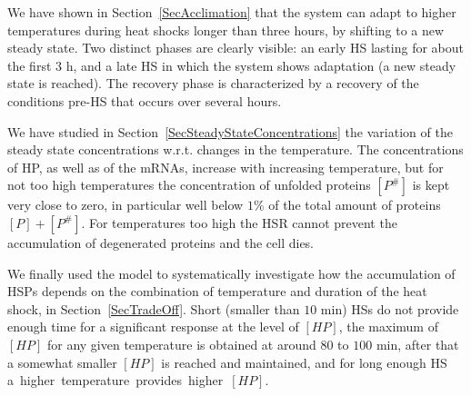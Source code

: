 \documentclass[oneside, 10pt, a4paper, twocolumn]{article}
\begin{document}
We have shown in Section~\ref{SecAcclimation} that the system can adapt to higher temperatures during heat shocks longer than three hours, by shifting to a new steady state. Two distinct phases are clearly visible: an early HS lasting for about the first $3$ h, and a late HS in which the system shows adaptation (a new steady state is reached). The recovery phase is characterized by a recovery of the conditions pre-HS that occurs over several hours. 
 
We have studied in Section~\ref{SecSteadyStateConcentrations} the variation of the steady state concentrations w.r.t. changes in the temperature. The concentrations of HP, as well as of the mRNAs, increase with increasing temperature, but for not too high temperatures the concentration of unfolded proteins $\left[P^\#\right]$ is kept very close to zero, in particular well below $1\%$ of the total amount of proteins $\left[P\right] + \left[P^\#\right]$. For temperatures too high the HSR cannot prevent the accumulation of degenerated proteins and the cell dies.

We finally used the model to systematically investigate how the accumulation of HSPs depends on the combination of temperature and duration of the heat shock, in Section~\ref{SecTradeOff}. Short (smaller than $10$ min) HSs do not provide enough time for a significant response at the level of $\left[HP\right]$, the maximum of $\left[HP\right]$ for any given temperature is obtained at around $80$ to $100$ min, after that a somewhat smaller $\left[HP\right]$ is reached and maintained, and for long enough HS \mbox{a higher temperature provides higher $\left[HP\right]$.}




\end{document}
